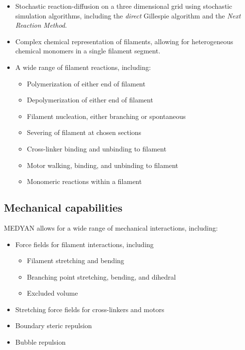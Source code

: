 \documentclass[11pt, oneside]{article}   	%
\begin{document}
\begin{itemize}

\item Stochastic reaction-diffusion on a three dimensional grid using stochastic simulation algorithms, including the \textit{direct} Gillespie algorithm and the \textit{Next Reaction Method}.
\item Complex chemical representation of filaments, allowing for heterogeneous chemical monomers in a single filament segment.
\item A wide range of filament reactions, including:
\begin{itemize}
\item Polymerization of either end of filament
\item Depolymerization of either end of filament
\item Filament nucleation, either branching or spontaneous
\item Severing of filament at chosen sections
\item Cross-linker binding and unbinding to filament
\item Motor walking, binding, and unbinding to filament
\item Monomeric reactions within a filament

\end{itemize}
\end{itemize}

\subsection{Mechanical capabilities}
MEDYAN allows for a wide range of mechanical interactions, including:

\begin{itemize}
\item Force fields for filament interactions, including
\begin{itemize}
\item Filament stretching and bending 
\item Branching point stretching, bending, and dihedral
\item Excluded volume 
\end{itemize}
\item Stretching force fields for cross-linkers and motors 
\item Boundary steric repulsion
\item Bubble repulsion
\end{itemize}
\end{document}
